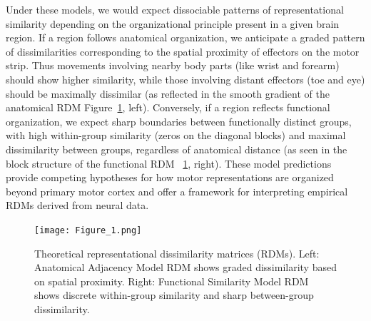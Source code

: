\documentclass{article}
\begin{document}
Under these models, we would expect dissociable patterns of representational similarity depending on the organizational principle present in a given brain region. If a region follows anatomical organization, we anticipate a graded pattern of dissimilarities corresponding to the spatial proximity of effectors on the motor strip. Thus movements involving nearby body parts (like wrist and forearm) should show higher similarity, while those involving distant effectors (toe and eye) should be maximally dissimilar (as reflected in the smooth gradient of the anatomical RDM Figure~\ref{fig:theoretical_rdms}, left). Conversely, if a region reflects functional organization, we expect sharp boundaries between functionally distinct groups, with high within-group similarity (zeros on the diagonal blocks) and maximal dissimilarity between groups, regardless of anatomical distance (as seen in the block structure of the functional RDM ~\ref{fig:theoretical_rdms}, right). These model predictions provide competing hypotheses for how motor representations are organized beyond primary motor cortex and offer a framework for interpreting empirical RDMs derived from neural data. 
\begin{figure}[!htbp]
\centering
\texttt{[image: Figure\_1.png]}
\caption{Theoretical representational dissimilarity matrices (RDMs). Left: Anatomical Adjacency Model RDM shows graded dissimilarity based on spatial proximity. Right: Functional Similarity Model RDM shows discrete within-group similarity and sharp between-group dissimilarity.}
\label{fig:theoretical_rdms}
\end{figure}




\end{document}
